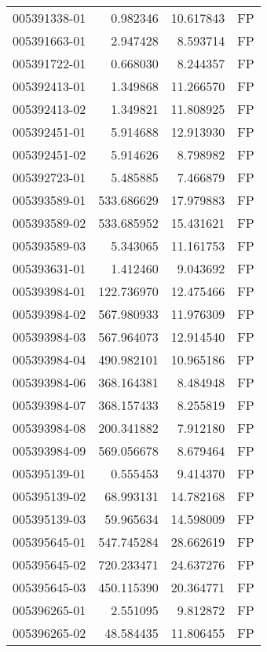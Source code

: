 \begin{tabular}{lrrl}
005391338-01 &    0.982346 &      10.617843 &   FP \\
005391663-01 &    2.947428 &       8.593714 &   FP \\
005391722-01 &    0.668030 &       8.244357 &   FP \\
005392413-01 &    1.349868 &      11.266570 &   FP \\
005392413-02 &    1.349821 &      11.808925 &   FP \\
005392451-01 &    5.914688 &      12.913930 &   FP \\
005392451-02 &    5.914626 &       8.798982 &   FP \\
005392723-01 &    5.485885 &       7.466879 &   FP \\
005393589-01 &  533.686629 &      17.979883 &   FP \\
005393589-02 &  533.685952 &      15.431621 &   FP \\
005393589-03 &    5.343065 &      11.161753 &   FP \\
005393631-01 &    1.412460 &       9.043692 &   FP \\
005393984-01 &  122.736970 &      12.475466 &   FP \\
005393984-02 &  567.980933 &      11.976309 &   FP \\
005393984-03 &  567.964073 &      12.914540 &   FP \\
005393984-04 &  490.982101 &      10.965186 &   FP \\
005393984-06 &  368.164381 &       8.484948 &   FP \\
005393984-07 &  368.157433 &       8.255819 &   FP \\
005393984-08 &  200.341882 &       7.912180 &   FP \\
005393984-09 &  569.056678 &       8.679464 &   FP \\
005395139-01 &    0.555453 &       9.414370 &   FP \\
005395139-02 &   68.993131 &      14.782168 &   FP \\
005395139-03 &   59.965634 &      14.598009 &   FP \\
005395645-01 &  547.745284 &      28.662619 &   FP \\
005395645-02 &  720.233471 &      24.637276 &   FP \\
005395645-03 &  450.115390 &      20.364771 &   FP \\
005396265-01 &    2.551095 &       9.812872 &   FP \\
005396265-02 &   48.584435 &      11.806455 &   FP \\

\end{tabular}
